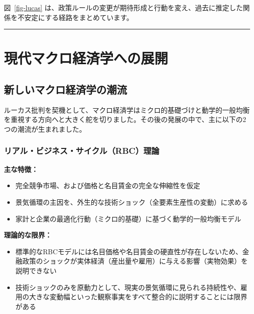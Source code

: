 \documentclass[
  japanese,
  lualatex,
  ja=standard,
  12pt,
  a4paper]{ltjsarticle}
\providecommand{\tightlist}{%
  \setlength{\itemsep}{0pt}\setlength{\parskip}{0pt}}
\begin{document}
図~\ref{fig-lucas}
は、政策ルールの変更が期待形成と行動を変え、過去に推定した関係を不安定にする経路をまとめています。

\begin{center}\rule{0.5\linewidth}{0.5pt}\end{center}

\section{現代マクロ経済学への展開}\label{ux73feux4ee3ux30deux30afux30edux7d4cux6e08ux5b66ux3078ux306eux5c55ux958b}

\subsection{新しいマクロ経済学の潮流}\label{ux65b0ux3057ux3044ux30deux30afux30edux7d4cux6e08ux5b66ux306eux6f6eux6d41}

ルーカス批判を契機として、マクロ経済学はミクロ的基礎づけと動学的一般均衡を重視する方向へと大きく舵を切りました。その後の発展の中で、主に以下の2つの潮流が生まれました。

\subsubsection{リアル・ビジネス・サイクル（RBC）理論}\label{ux30eaux30a2ux30ebux30d3ux30b8ux30cdux30b9ux30b5ux30a4ux30afux30ebrbcux7406ux8ad6}

\textbf{主な特徴：}

\begin{itemize}
\tightlist
\item
  完全競争市場、および価格と名目賃金の完全な伸縮性を仮定
\item
  景気循環の主因を、外生的な技術ショック（全要素生産性の変動）に求める
\item
  家計と企業の最適化行動（ミクロ的基礎）に基づく動学的一般均衡モデル
\end{itemize}

\textbf{理論的な限界：}

\begin{itemize}
\tightlist
\item
  標準的なRBCモデルには名目価格や名目賃金の硬直性が存在しないため、金融政策のショックが実体経済（産出量や雇用）に与える影響（実物効果）を説明できない
\item
  技術ショックのみを原動力として、現実の景気循環に見られる持続性や、雇用の大きな変動幅といった観察事実をすべて整合的に説明することには限界がある
\end{itemize}
\end{document}
